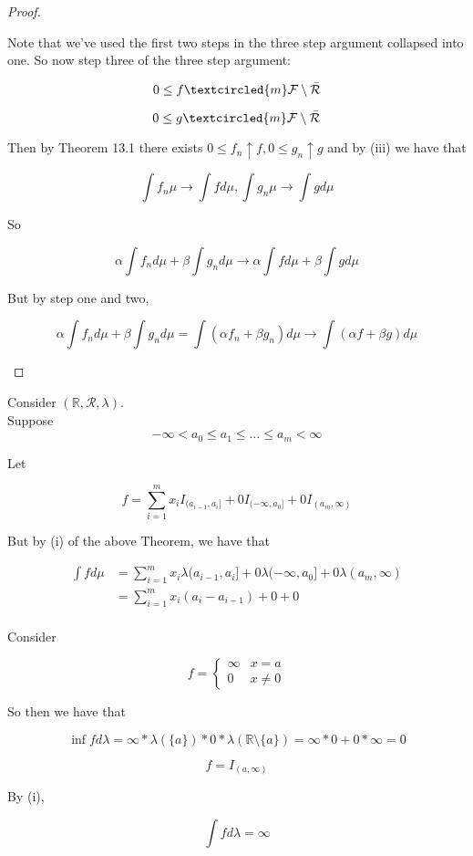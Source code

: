 \documentclass[11pt,fleqn]{book} %
\begin{document}
\begin{proof}
\begin{enumerate}
				Note that we've used the first two steps in the three step argument collapsed into one. So now step three of the three step argument:

						$$0 \leq f \textcircled{m} \mathcal{F}\setminus\bar{\mathcal{R}} $$

						$$0 \leq g \textcircled{m} \mathcal{F}\setminus \bar{\mathcal{R}} $$

				Then by Theorem 13.1 there exists $0 \leq f_n \uparrow f, 0 \leq g_n \uparrow g$ and by (iii) we have that

						$$\int f_n \mu \rightarrow\int f d\mu,  \int g_n \mu \rightarrow\int g d\mu$$

				So 

						$$\alpha \int f_n d\mu + \beta \int g_n d\mu \rightarrow \alpha \int f d\mu + \beta \int g d\mu $$

				But by step one and two, 

						$$\alpha \int f_n d\mu + \beta \int g_n d\mu = \int (\alpha f_n + \beta	g_n) d\mu \rightarrow \int (\alpha f + \beta g) d\mu $$

	\end{enumerate}
\end{proof}


\begin{exercise}[Application of (i)]
	Consider $(\mathbb{R}, \mathcal{R}, \lambda)$.\\

	Suppose 
			$$-\infty < a_0 \leq a_1 \leq \dots \leq a_m < \infty$$

	Let 

			$$ f = \sum^m_{i=1} x_i I_{(a_{i-1}, a_i]} + 0 I_{(-\infty, a_0]} + 0 I_{(a_m, \infty)}$$


	But by (i) of the above Theorem, we have that

			\begin{align*}
				\int f d\mu &= \sum^m_{i=1} x_i \lambda{(a_{i-1}, a_i]} + 0 \lambda{(-\infty, a_0]} + 0 \lambda{(a_m, \infty)} \\
						&= \sum^m_{i=1} x_i (a_i - a_{i -1}) + 0 + 0\\
			\end{align*}

	Consider 

			$$f = \left\{\begin{array}{ll}
				\infty & x = a\\
				0 & x \neq 0
			\end{array}\right. $$

	So then we have that

			$$\inf f d\lambda = \infty * \lambda(\{a\}) * 0 * \lambda(\mathbb{R}\setminus\{a\}) = \infty * 0 + 0 * \infty = 0$$


			$$f = I_{(a, \infty)} $$

	By (i), 

			$$\int f d\lambda = \infty $$
\end{exercise}
\end{document}
